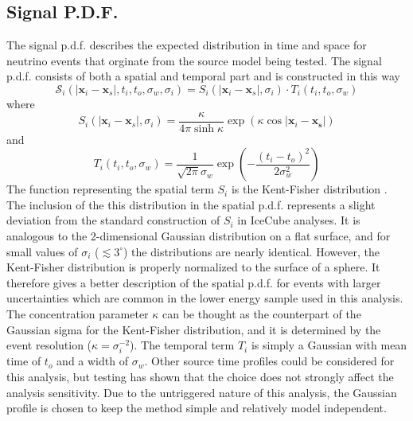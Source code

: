 \documentclass{gatech-thesis}
\begin{document}
\subsection{Signal P.D.F.}
The signal p.d.f. describes the expected distribution in time and space for neutrino events that orginate from the source model being tested. The signal p.d.f. consists of both a spatial and temporal part and is constructed in this way
\begin{equation}
\mathcal{S}_i(|\mathbf{x}_i-\mathbf{x}_s|,t_i,t_o,\sigma_w,\sigma_i) = S_i(|\mathbf{x}_i-\mathbf{x}_s|,\sigma_i) \cdot T_i(t_i,t_o,\sigma_w)
\end{equation}
where
\begin{equation}
S_i(|\mathbf{x}_i-\mathbf{x}_s|,\sigma_i) = \frac{\kappa}{4\pi \sinh \kappa} \exp \left(\kappa \cos |\mathbf{x}_i-\mathbf{x_s}|\right)
\end{equation}
and
\begin{equation}
T_i(t_i,t_o,\sigma_w) = \frac{1}{\sqrt{2\pi}\sigma_w} \exp \left(-\frac{(t_i-t_o)^2}{2 \sigma_w^2}\right)
\end{equation}
The function representing the spatial term $S_i$ is the Kent-Fisher distribution \cite{1982}. The inclusion of the this distribution in the spatial p.d.f. represents a slight deviation from the standard construction of $S_i$ in IceCube analyses. It is analogous to the 2-dimensional Gaussian distribution on a flat surface, and for small values of $\sigma_{i}$ ($\lesssim 3^{\circ}$) the distributions are nearly identical. However, the Kent-Fisher distribution is properly normalized to the surface of a sphere. It therefore gives a better description of the spatial p.d.f. for events with larger uncertainties which are common in the lower energy sample used in this analysis. The concentration parameter $\kappa$ can be thought as the counterpart of the Gaussian sigma for the Kent-Fisher distribution, and it is determined by the event resolution ($\kappa = \sigma_{i}^{-2}$). The temporal term $T_i$ is simply a Gaussian with mean time of $t_o$ and a width of $\sigma_w$. Other source time profiles could be considered for this analysis, but testing has shown that the choice does not strongly affect the analysis sensitivity. Due to the untriggered nature of this analysis, the Gaussian profile is chosen to keep the method simple and relatively model independent. 
	
\end{document}
